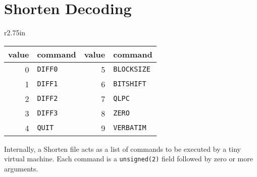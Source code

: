 \section{Shorten Decoding}
\begin{wrapfigure}[4]{r}{2.75in}
\begin{tabular}{|r|l||r|l|}
\hline
value & command & value & command \\
\hline
0 & \texttt{DIFF0} & 5 & \texttt{BLOCKSIZE} \\
1 & \texttt{DIFF1} & 6 & \texttt{BITSHIFT} \\
2 & \texttt{DIFF2} & 7 & \texttt{QLPC} \\
3 & \texttt{DIFF3} & 8 & \texttt{ZERO} \\
4 & \texttt{QUIT} & 9 & \texttt{VERBATIM} \\
\hline
\end{tabular}
\end{wrapfigure}
Internally,
a Shorten file acts as a list of commands to be executed by a tiny
virtual machine.
Each command is a \texttt{unsigned(2)} field followed by zero or more
arguments.

